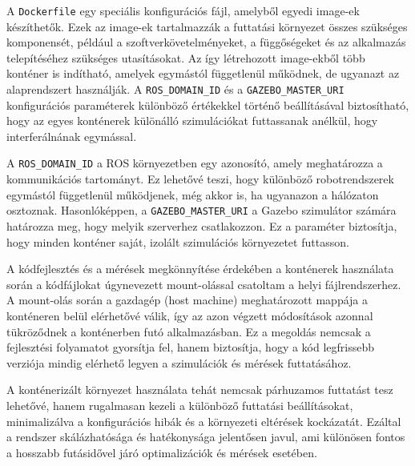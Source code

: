 A \texttt{Dockerfile} egy speciális konfigurációs fájl, amelyből egyedi image-ek készíthetők. Ezek az image-ek tartalmazzák a futtatási környezet összes szükséges komponensét, például a szoftverkövetelményeket, a függőségeket és az alkalmazás telepítéséhez szükséges utasításokat. Az így létrehozott image-ekből több konténer is indítható, amelyek egymástól függetlenül működnek, de ugyanazt az alaprendszert használják. A \texttt{ROS\_DOMAIN\_ID} és a \texttt{GAZEBO\_MASTER\_URI} konfigurációs paraméterek különböző értékekkel történő beállításával biztosítható, hogy az egyes konténerek különálló szimulációkat futtassanak anélkül, hogy interferálnának egymással.

A \texttt{ROS\_DOMAIN\_ID} a ROS környezetben egy azonosító, amely meghatározza a kommunikációs tartományt. Ez lehetővé teszi, hogy különböző robotrendszerek egymástól függetlenül működjenek, még akkor is, ha ugyanazon a hálózaton osztoznak. Hasonlóképpen, a \texttt{GAZEBO\_MASTER\_URI} a Gazebo szimulátor számára határozza meg, hogy melyik szerverhez csatlakozzon. Ez a paraméter biztosítja, hogy minden konténer saját, izolált szimulációs környezetet futtasson.

A kódfejlesztés és a mérések megkönnyítése érdekében a konténerek használata során a kódfájlokat úgynevezett mount-olással csatoltam a helyi fájlrendszerhez. A mount-olás során a gazdagép (host machine) meghatározott mappája a konténeren belül elérhetővé válik, így az azon végzett módosítások azonnal tükröződnek a konténerben futó alkalmazásban. Ez a megoldás nemcsak a fejlesztési folyamatot gyorsítja fel, hanem biztosítja, hogy a kód legfrissebb verziója mindig elérhető legyen a szimulációk és mérések futtatásához.

A konténerizált környezet használata tehát nemcsak párhuzamos futtatást tesz lehetővé, hanem rugalmasan kezeli a különböző futtatási beállításokat, minimalizálva a konfigurációs hibák és a környezeti eltérések kockázatát. Ezáltal a rendszer skálázhatósága és hatékonysága jelentősen javul, ami különösen fontos a hosszabb futásidővel járó optimalizációk és mérések esetében.
